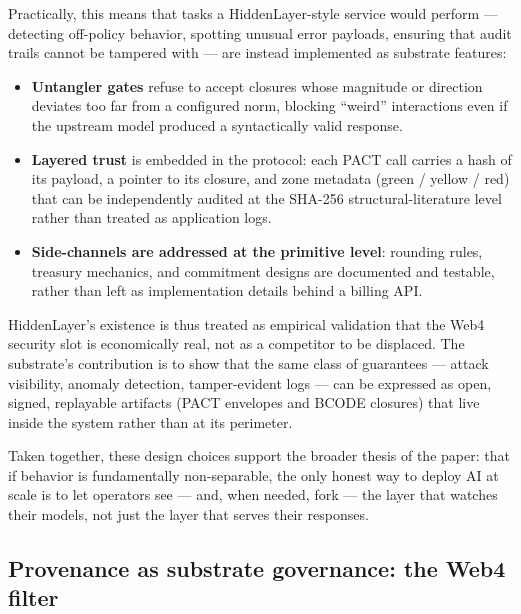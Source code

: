 \documentclass{article}
\providecommand{\tightlist}{\setlength{\itemsep}{0pt}\setlength{\parskip}{0pt}}
\begin{document}
Practically, this means that tasks a HiddenLayer-style service would
perform --- detecting off-policy behavior, spotting unusual error
payloads, ensuring that audit trails cannot be tampered with --- are
instead implemented as substrate features:

\begin{itemize}
\tightlist
\item
  \textbf{Untangler gates} refuse to accept closures whose magnitude or
  direction deviates too far from a configured norm, blocking ``weird''
  interactions even if the upstream model produced a syntactically valid
  response.
\item
  \textbf{Layered trust} is embedded in the protocol: each PACT call
  carries a hash of its payload, a pointer to its closure, and zone
  metadata (green / yellow / red) that can be independently audited at
  the SHA-256 structural-literature level rather than treated as
  application logs.
\item
  \textbf{Side-channels are addressed at the primitive level}: rounding
  rules, treasury mechanics, and commitment designs are documented and
  testable, rather than left as implementation details behind a billing
  API.
\end{itemize}

HiddenLayer's existence is thus treated as empirical validation that the
Web4 security slot is economically real, not as a competitor to be
displaced. The substrate's contribution is to show that the same class
of guarantees --- attack visibility, anomaly detection, tamper-evident
logs --- can be expressed as open, signed, replayable artifacts (PACT
envelopes and BCODE closures) that live inside the system rather than at
its perimeter.

Taken together, these design choices support the broader thesis of the
paper: that if behavior is fundamentally non-separable, the only honest
way to deploy AI at scale is to let operators see --- and, when needed,
fork --- the layer that watches their models, not just the layer that
serves their responses.

\subsection{Provenance as substrate governance: the Web4
filter}\label{provenance-as-substrate-governance-the-web4-filter}
\end{document}
